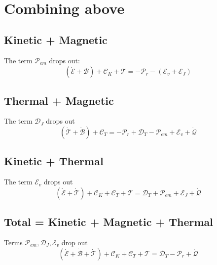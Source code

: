 \documentclass[11pt]{article}
\newcommand{\MC}{\mathcal}
\begin{document}
\section{Combining above}
\subsection{Kinetic + Magnetic}
The term $\MC P_{em}$ drops out:
\begin{equation}
	(\dot{\MC E} + \dot{\MC B}) + \MC C_K + \MC T = -\MC P_r - (\MC E_v + \MC E_J)
\end{equation}

\subsection{Thermal + Magnetic}
The term $\MC D_J$ drops out
\begin{equation}
	(\dot{\MC T}+\dot{\MC B}) + \MC C_T = -\MC P_r + \MC D_T - \MC P_{em} + \MC E_v + \dot{\MC Q}
\end{equation}

\subsection{Kinetic + Thermal}
The term $\MC E_v$ drops out
\begin{equation}
	(\dot{\MC E}+\dot{\MC T}) + \MC C_K + \MC C_T + \MC T = \MC D_T + \MC P_{em} + \MC E_J + \dot{\MC Q}
\end{equation}

\subsection{Total = Kinetic + Magnetic + Thermal}
Terms $\MC P_{em}, \MC D_J, \MC E_v$ drop out
\begin{equation}
	(\dot{\MC E}+\dot{\MC B}+\dot{\MC T}) + \MC C_K + \MC C_T + \MC T = \MC D_T - \MC P_r + \dot{\MC Q}
\end{equation}
\end{document}

